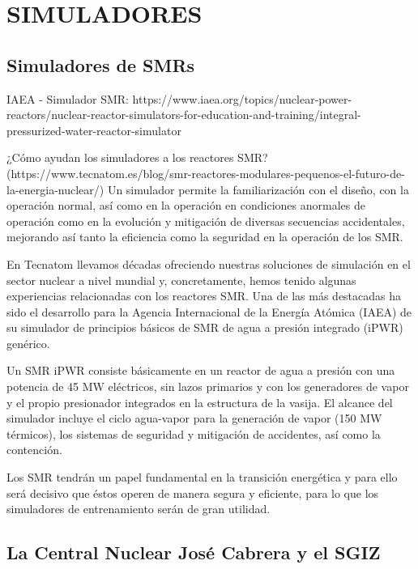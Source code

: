 \newpage
\section{SIMULADORES} \label{simuladores}

\subsection{Simuladores de SMRs}

IAEA - Simulador SMR: https://www.iaea.org/topics/nuclear-power-reactors/nuclear-reactor-simulators-for-education-and-training/integral-pressurized-water-reactor-simulator

¿Cómo ayudan los simuladores a los reactores SMR?\newline
(https://www.tecnatom.es/blog/smr-reactores-modulares-pequenos-el-futuro-de-la-energia-nuclear/)
Un simulador permite la familiarización con el diseño, con la operación normal, así como en la operación en condiciones anormales de operación como en la evolución y mitigación de diversas secuencias accidentales, mejorando así tanto la eficiencia como la seguridad en la operación de los SMR.

En Tecnatom llevamos décadas ofreciendo nuestras soluciones de simulación en el sector nuclear a nivel mundial y, concretamente, hemos tenido algunas experiencias relacionadas con los reactores SMR. Una de las más destacadas ha sido el desarrollo para la Agencia Internacional de la Energía Atómica (IAEA) de su simulador de principios básicos de SMR de agua a presión integrado (iPWR) genérico.

Un SMR iPWR consiste básicamente en un reactor de agua a presión con una potencia de 45 MW eléctricos, sin lazos primarios y con los generadores de vapor y el propio presionador integrados en la estructura de la vasija. El alcance del simulador incluye el ciclo agua-vapor para la generación de vapor (150 MW térmicos), los sistemas de seguridad y mitigación de accidentes, así como la contención.

Los SMR tendrán un papel fundamental en la transición energética y para ello será decisivo que éstos operen de manera segura y eficiente, para lo que los simuladores de entrenamiento serán de gran utilidad.

\subsection{La Central Nuclear José Cabrera y el SGIZ}

